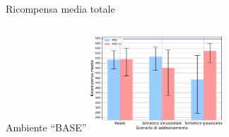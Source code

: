 \documentclass[]{beamer}
\begin{document}
\begin{frame}{Ricompensa media totale}
    \begin{columns}
        \begin{column}{.5\textwidth}           
            \centering
            \small Ambiente ``BASE''
            \includegraphics[width=5cm]{assets/slides/eval_BASE_summary_reward.pdf}
        \end{column}
    \end{columns}



\end{frame}
\end{document}
